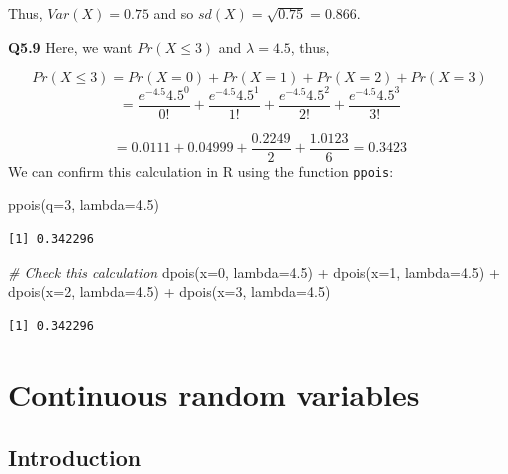 \documentclass[
  oneside]{krantz}
\newenvironment{Shaded}{\begin{snugshade}}{\end{snugshade}}
\newcommand{\AttributeTok}[1]{\textcolor[rgb]{0.77,0.63,0.00}{#1}}
\newcommand{\CommentTok}[1]{\textcolor[rgb]{0.56,0.35,0.01}{\textit{#1}}}
\newcommand{\DecValTok}[1]{\textcolor[rgb]{0.00,0.00,0.81}{#1}}
\newcommand{\FloatTok}[1]{\textcolor[rgb]{0.00,0.00,0.81}{#1}}
\newcommand{\FunctionTok}[1]{\textcolor[rgb]{0.00,0.00,0.00}{#1}}
\newcommand{\NormalTok}[1]{#1}
\newcommand{\SpecialCharTok}[1]{\textcolor[rgb]{0.00,0.00,0.00}{#1}}
\begin{document}
Thus, \(Var(X)=0.75\) and so \(sd(X)=\sqrt{0.75}=0.866\).

\textbf{Q5.9} Here, we want \(Pr(X \le 3)\) and \(\lambda=4.5\), thus,

\[Pr(X\le 3) = Pr(X=0) + Pr(X=1) + Pr(X=2) + Pr(X=3) \]
\[ = \frac{e^{-4.5}4.5^0}{0!} + \frac{e^{-4.5}4.5^1}{1!} + \frac{e^{-4.5}4.5^2}{2!} + \frac{e^{-4.5}4.5^3}{3!}\]

\[ = 0.0111 + 0.04999 + \frac{0.2249}{2} + \frac{1.0123}{6} = 0.3423\]
We can confirm this calculation in R using the function \texttt{ppois}:

\begin{Shaded}
\begin{Highlighting}[]
\FunctionTok{ppois}\NormalTok{(}\AttributeTok{q=}\DecValTok{3}\NormalTok{, }\AttributeTok{lambda=}\FloatTok{4.5}\NormalTok{)}
\end{Highlighting}
\end{Shaded}

\begin{verbatim}
[1] 0.342296
\end{verbatim}

\begin{Shaded}
\begin{Highlighting}[]
\CommentTok{\# Check this calculation}
\FunctionTok{dpois}\NormalTok{(}\AttributeTok{x=}\DecValTok{0}\NormalTok{, }\AttributeTok{lambda=}\FloatTok{4.5}\NormalTok{) }\SpecialCharTok{+} \FunctionTok{dpois}\NormalTok{(}\AttributeTok{x=}\DecValTok{1}\NormalTok{, }\AttributeTok{lambda=}\FloatTok{4.5}\NormalTok{) }\SpecialCharTok{+} 
  \FunctionTok{dpois}\NormalTok{(}\AttributeTok{x=}\DecValTok{2}\NormalTok{, }\AttributeTok{lambda=}\FloatTok{4.5}\NormalTok{) }\SpecialCharTok{+} \FunctionTok{dpois}\NormalTok{(}\AttributeTok{x=}\DecValTok{3}\NormalTok{, }\AttributeTok{lambda=}\FloatTok{4.5}\NormalTok{)}
\end{Highlighting}
\end{Shaded}

\begin{verbatim}
[1] 0.342296
\end{verbatim}

\hypertarget{contrv}{%
\chapter{Continuous random variables}\label{contrv}}

\hypertarget{INTcontrv}{%
\section{Introduction}\label{INTcontrv}}
\end{document}
